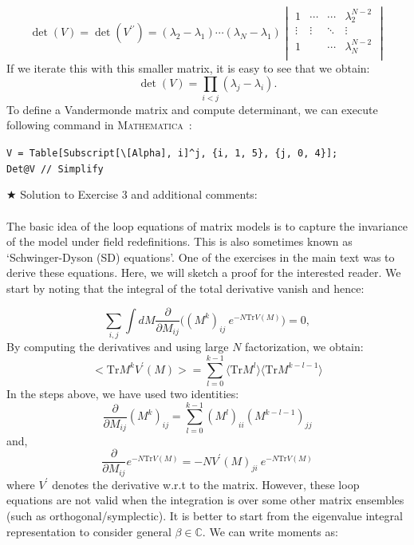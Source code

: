 \documentclass[11pt]{article}
\newcommand{\MA}{\textsc{Mathematica}}
\begin{document}
\begin{equation}
	\det(V) = \det(V^{\prime\prime}) = 
	(\lambda_2 - \lambda_1) \cdots (\lambda_N - \lambda_1)
	\begin{vmatrix}
		1 & \cdots & \cdots & \lambda_2^{N-2} \\ 
		\vdots  & \vdots  & \ddots & \vdots  \\
		1 &  & \cdots &  \lambda_N^{N-2} \\
	\end{vmatrix}
\end{equation}
If we iterate this with this smaller matrix, it is easy to see that we obtain:
\begin{equation}
	\det(V) = \prod_{i<j} (\lambda_j - \lambda_i).
\end{equation}
To define a Vandermonde matrix and compute determinant, we can execute following command in \MA~:
\begin{mdframed}[backgroundcolor=magenta!2]
	\begin{footnotesize} 
		\verb"V = Table[Subscript[\[Alpha], i]^j, {i, 1, 5}, {j, 0, 4}];"\\ 
		\verb"Det@V // Simplify"
	\end{footnotesize} 
\end{mdframed}

\noindent $\bigstar$ Solution to Exercise 3 and additional comments: 
\\ \\ 
The basic idea of the loop equations of matrix models is to capture the invariance of the model under field redefinitions. This is also sometimes known as `Schwinger-Dyson (SD) equations'. One of the exercises in the main text was to derive these equations. Here, we will sketch a proof for the interested reader. We start by noting that the integral of the total derivative vanish and hence:

\begin{equation}
	\sum_{i,j} \int dM \frac{\partial}{\partial M_{ij}} \Bigg( (M^k)_{ij}~e^{-N\mathrm{Tr} V(M)}\Bigg) = 0, 
\end{equation}
By computing the derivatives and using large $N$ factorization, we obtain:
\begin{equation}
	\Big< \mathrm{Tr} M^{k} V^{\prime}(M) \Big> = \sum_{l=0}^{k-1} \langle \mathrm{Tr} M^{l} \rangle  \langle \mathrm{Tr} M^{k-l-1} \rangle
\end{equation}
In the steps above, we have used two identities:
\begin{equation}
	\frac{\partial}{\partial M_{ij}} (M^{k})_{ij} = \sum_{l=0}^{k-1} (M^{l})_{ii} (M^{k-l-1})_{jj}
\end{equation}
and, 
\begin{equation}
	\frac{\partial}{\partial M_{ij}} e^{-N\mathrm{Tr} V(M)} = -N V^{\prime}(M)_{ji}~e^{-N\mathrm{Tr} V(M)}
\end{equation}
where $V^{\prime}$ denotes the derivative w.r.t to the matrix. 
However, these loop equations are not valid when the integration is over some other matrix ensembles (such as orthogonal/symplectic). It is better to start from the eigenvalue integral representation to consider general $\beta \in \mathbb{C}$. We can write moments as:
\end{document}
